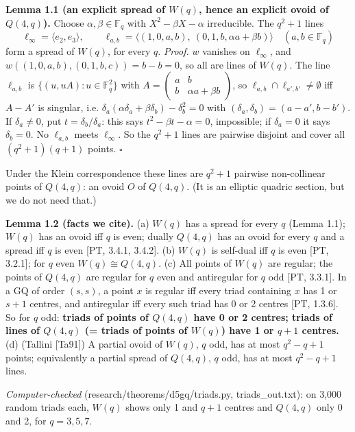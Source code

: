 \documentclass[
  11pt,
]{article}
\begin{document}
\textbf{Lemma 1.1 (an explicit spread of \(W(q)\), hence an explicit
ovoid of \(Q(4,q)\)).} Choose \(\alpha,\beta\in\mathbb F_q\) with
\(X^2-\beta X-\alpha\) irreducible. The \(q^2+1\) lines
\[\ell_\infty = \langle e_2,e_3\rangle,\qquad \ell_{a,b} = \langle (1,0,a,b),\ (0,1,b,\alpha a+\beta b)\rangle\quad(a,b\in\mathbb F_q)\]
form a spread of \(W(q)\), for every \(q\). \emph{Proof.} \(w\) vanishes
on \(\ell_\infty\), and \(w((1,0,a,b),(0,1,b,c)) = b - b = 0\), so all
are lines of \(W(q)\). The line \(\ell_{a,b}\) is
\(\{(u,uA): u\in\mathbb F_q^2\}\) with
\(A = \begin{pmatrix} a&b\\ b&\alpha a+\beta b\end{pmatrix}\), so
\(\ell_{a,b}\cap\ell_{a',b'}\neq\emptyset\) iff \(A-A'\) is singular,
i.e. \(\delta_a(\alpha\delta_a+\beta\delta_b) - \delta_b^2 = 0\) with
\((\delta_a,\delta_b) = (a-a',b-b')\). If \(\delta_a\ne 0\), put
\(t = \delta_b/\delta_a\): this says \(t^2-\beta t-\alpha = 0\),
impossible; if \(\delta_a = 0\) it says \(\delta_b = 0\). No
\(\ell_{a,b}\) meets \(\ell_\infty\). So the \(q^2+1\) lines are
pairwise disjoint and cover all \((q^2+1)(q+1)\) points. \(\square\)

Under the Klein correspondence these lines are \(q^2+1\) pairwise
non-collinear points of \(Q(4,q)\): an ovoid \(O\) of \(Q(4,q)\). (It is
an elliptic quadric section, but we do not need that.)

\textbf{Lemma 1.2 (facts we cite).} (a) \(W(q)\) has a spread for every
\(q\) (Lemma 1.1); \(W(q)\) has an ovoid iff \(q\) is even; dually
\(Q(4,q)\) has an ovoid for every \(q\) and a spread iff \(q\) is even
{[}PT, 3.4.1, 3.4.2{]}. (b) \(W(q)\) is self-dual iff \(q\) is even
{[}PT, 3.2.1{]}; for \(q\) even \(W(q)\cong Q(4,q)\). (c) All points of
\(W(q)\) are regular; the points of \(Q(4,q)\) are regular for \(q\)
even and antiregular for \(q\) odd {[}PT, 3.3.1{]}. In a GQ of order
\((s,s)\), a point \(x\) is regular iff every triad containing \(x\) has
1 or \(s+1\) centres, and antiregular iff every such triad has 0 or 2
centres {[}PT, 1.3.6{]}. So for \(q\) odd: \textbf{triads of points of
\(Q(4,q)\) have 0 or 2 centres; triads of lines of \(Q(4,q)\) (= triads
of points of \(W(q)\)) have 1 or \(q+1\) centres.} (d) (Tallini
{[}Ta91{]}) A partial ovoid of \(W(q)\), \(q\) odd, has at most
\(q^2-q+1\) points; equivalently a partial spread of \(Q(4,q)\), \(q\)
odd, has at most \(q^2-q+1\) lines.

\emph{Computer-checked} (research/theorems/d5gq/triads.py,
triads\_out.txt): on 3,000 random triads each, \(W(q)\) shows only 1 and
\(q+1\) centres and \(Q(4,q)\) only 0 and 2, for \(q = 3,5,7\).
\end{document}
